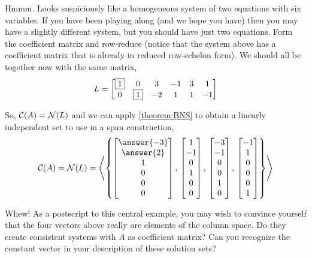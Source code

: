 \documentclass{ximera}
\begin{document}
\begin{example}
Hmmm.  Looks suspiciously like a homogeneous system of two equations
with six variables.  If you have been playing along (and we hope you
have) then you may have a slightly different system, but you should
have just two equations.  Form the coefficient matrix and row-reduce
(notice that the system above has a coefficient matrix that is already
in reduced row-echelon form).  We should all be together now with the
same matrix,
\[
L=
\begin{bmatrix}
 \fbox{1} & 0 & 3 & -1 & 3 & 1 \\
 0 & \fbox{1} & -2 & 1 & 1 & -1
\end{bmatrix}
\]

So, $\mathcal{C}\!\left(A\right)=\mathcal{N}\!\left(L\right)$ and we can apply \ref{theorem:BNS} to obtain a linearly independent set to use in a span construction,
\[
\csp{A}=\nsp{L}=\spn{\set{
\colvector{\answer{-3}\\\answer{2}\\1\\0\\0\\0},\,
\colvector{1\\-1\\0\\1\\0\\0},\,
\colvector{-3\\-1\\0\\0\\1\\0},\,
\colvector{-1\\1\\0\\0\\0\\1}
}}
\]

Whew!  As a postscript to this central example, you may wish to convince yourself that the four vectors above really are elements of the column space.  Do they create consistent systems with $A$ as coefficient matrix?  Can you recognize the constant vector in your description of these solution sets?
\end{example}
\end{document}
